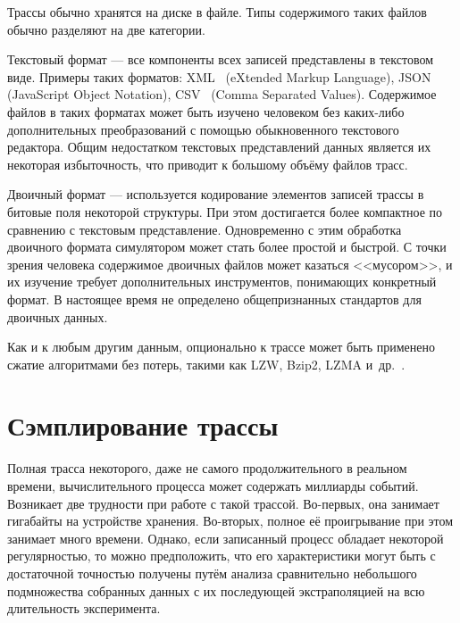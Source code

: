 Трассы обычно хранятся на диске в файле. Типы содержимого таких файлов обычно разделяют на две категории.

\begin{description*}
    \item[Текстовый формат] --- все компоненты всех записей представлены в текстовом виде. Примеры таких форматов: XML~\cite{xml-std} (\abbr eXtended Markup Language), JSON~\cite{json-std} (\abbr  JavaScript Object Notation), CSV~\cite{csv-rfc} (\abbr Comma Separated Values). Содержимое файлов в таких форматах может быть изучено человеком без каких-либо дополнительных преобразований с помощью обыкновенного текстового редактора. Общим недостатком текстовых представлений данных является их некоторая избыточность, что приводит к большому объёму файлов трасс. 
    
    \item[Двоичный формат] --- используется кодирование элементов записей трассы в битовые поля некоторой структуры. При этом достигается более компактное по сравнению с текстовым представление. Одновременно с этим обработка двоичного формата симулятором может стать более простой и быстрой. С точки зрения человека содержимое двоичных файлов может казаться <<мусором>>, и их изучение требует дополнительных инструментов, понимающих конкретный формат. В настоящее время не определено общепризнанных стандартов для двоичных данных.
\end{description*}

Как и к любым другим данным, опционально к трассе может быть применено сжатие алгоритмами без потерь, такими как LZW, Bzip2, LZMA и~др.~\cite{sayood2002lossless}.

\section{Сэмплирование трассы}\label{sec:sampling}

Полная трасса некоторого, даже не самого продолжительного в реальном времени, вычислительного процесса может содержать миллиарды событий. Возникает две трудности при работе с такой трассой. Во-первых, она занимает гигабайты на устройстве хранения. Во-вторых, полное её проигрывание при этом занимает много времени. Однако, если записанный процесс обладает некоторой регулярностью, то можно предположить, что его характеристики могут быть с достаточной точностью получены путём анализа сравнительно небольшого подмножества собранных данных с их последующей экстраполяцией на всю длительность эксперимента.

